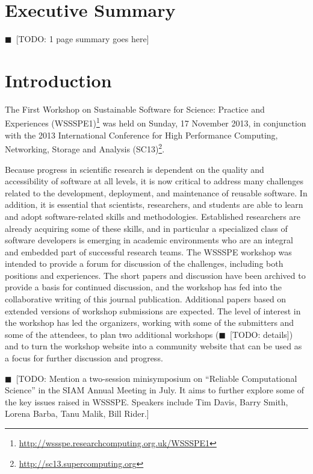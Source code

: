 \documentclass[11pt, oneside]{amsart}
\newcommand{\todo}[1]{{\color{blue}$\blacksquare$~\textsf{[TODO: #1]}}}
\begin{document}
\pagebreak

\section*{Executive Summary}

\todo{1 page summary goes here}

\pagebreak

\section{Introduction}

The First Workshop on Sustainable Software for Science: Practice and Experiences (WSSSPE1)\footnote{\url{http://wssspe.researchcomputing.org.uk/WSSSPE1}} was held on Sunday, 17 November 2013, in conjunction with the 2013 International Conference for High Performance Computing, Networking, Storage and Analysis (SC13)\footnote{\url{http://sc13.supercomputing.org}}.

Because progress in scientific research is dependent on the quality and accessibility
of software at all levels, it is now critical to address many challenges related to the
development, deployment, and maintenance of reusable software. In addition, it is
essential that scientists, researchers, and students are able to learn and adopt
software-related skills and methodologies. Established researchers are already
acquiring some of these skills, and in particular a specialized class of software
developers is emerging in academic environments who are an integral and embedded
part of successful research teams. The WSSSPE workshop was intended to provide a
forum for discussion of the challenges, including both positions and experiences.
The short papers and discussion have been archived to provide a basis for continued
discussion, and the workshop has fed into the collaborative writing of this journal publication.
Additional papers based on extended versions of workshop submissions are expected.
The level of interest in the workshop has led the organizers, working with some of the submitters
and some of the attendees, to plan two additional workshops (\todo{details}) and to turn
the workshop website into a community website that can be used as a focus for further
discussion and progress.

\todo{Mention a two-session minisymposium on ``Reliable Computational Science'' in the SIAM Annual Meeting in July. It aims to further explore some of the key issues raised in WSSSPE. Speakers include Tim Davis, Barry Smith, Lorena Barba, Tanu Malik, Bill Rider.}
\end{document}
